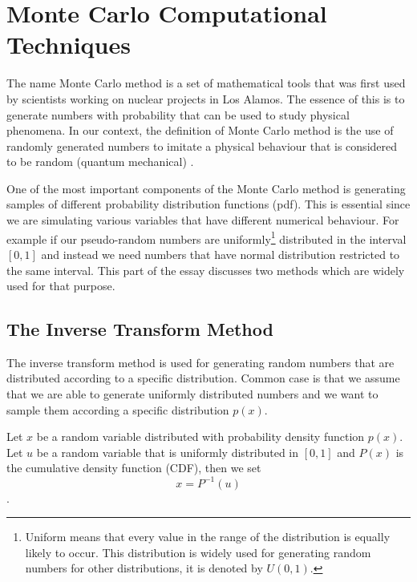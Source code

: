 \chapter{Monte Carlo Computational Techniques}

The name Monte Carlo method is a set of mathematical tools that was first used by scientists working on nuclear projects in Los Alamos. The essence of this is to generate numbers with probability that can be used to study physical phenomena. In our context, the definition of Monte Carlo method is the use of randomly generated numbers to imitate a physical behaviour that is considered to be random (quantum mechanical) \citep{montecarlo}.


One of the most important components of the Monte Carlo method is generating samples of different probability distribution functions (pdf). This is essential since we are simulating various variables that have different numerical behaviour. For example if our pseudo-random numbers are uniformly\footnote{Uniform means that every value in the range of the distribution is equally likely to occur. This distribution is widely used for generating random numbers for other distributions, it is denoted by $U (0,1)$.} distributed in the interval $[0,1]$  and instead we need numbers that have normal distribution restricted to the same interval. This part of the essay  discusses two methods which are widely used for that purpose.


\section{The Inverse Transform Method}

The inverse transform method is used for generating random numbers that are distributed according to a specific distribution. Common case is that we assume that we are able to generate uniformly distributed numbers and we want to sample them according a specific distribution $p(x)$.

Let $x$ be a random variable distributed with probability density function $p(x)$. Let $u$ be a random variable that is uniformly distributed in $[0,1]$ and $P(x)$ is the cumulative density function (CDF), then we set 
\begin{equation}
x = P^{-1} (u)
\end{equation}\citep{Weinzierl}.

